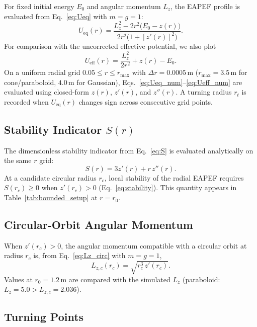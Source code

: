 \documentclass[11pt,letterpaper]{article}
\begin{document}
For fixed initial energy $E_0$ and angular momentum $L_z$, the EAPEF profile is evaluated from Eq.~\eqref{eq:Ueq} with $m=g=1$:
\begin{equation}\label{eq:Ueq_num}
    U_{\mathrm{eq}}(r)
    = \frac{L_z^2 - 2r^2\bigl(E_0 - z(r)\bigr)}
           {2r^2\bigl(1 + [z'(r)]^2\bigr)}.
\end{equation}
For comparison with the uncorrected effective potential, we also plot
\begin{equation}\label{eq:Ueff_num}
    U_{\mathrm{eff}}(r) = \frac{L_z^2}{2r^2} + z(r) - E_0.
\end{equation}
On a uniform radial grid $0.05\le r\le r_{\max}$ with $\Delta r=0.0005\,\mathrm{m}$ ($r_{\max}=3.5\,\mathrm{m}$ for cone/paraboloid, $4.0\,\mathrm{m}$ for Gaussian), Eqs.~\eqref{eq:Ueq_num}--\eqref{eq:Ueff_num} are evaluated using closed-form $z(r)$, $z'(r)$, and $z''(r)$. A turning radius $r_t$ is recorded when $U_{\mathrm{eq}}(r)$ changes sign across consecutive grid points.

\subsection{Stability Indicator $S(r)$}
\label{sec:analysis_S}

The dimensionless stability indicator from Eq.~\eqref{eq:S} is evaluated analytically on the same $r$ grid:
\begin{equation}\label{eq:S_num}
    S(r) = 3z'(r) + r\,z''(r).
\end{equation}
At a candidate circular radius $r_c$, local stability of the radial EAPEF requires $S(r_c)\ge 0$ when $z'(r_c)>0$ (Eq.~\eqref{eq:stability}). This quantity appears in Table~\ref{tab:bounded_setup} at $r=r_0$.

\subsection{Circular-Orbit Angular Momentum}
\label{sec:analysis_Lzc}

When $z'(r_c)>0$, the angular momentum compatible with a circular orbit at radius $r_c$ is, from Eq.~\eqref{eq:Lz_circ} with $m=g=1$,
\begin{equation}\label{eq:Lzc_num}
    L_{z,c}(r_c) = \sqrt{r_c^3\,z'(r_c)}.
\end{equation}
Values at $r_0=1.2\,\mathrm{m}$ are compared with the simulated $L_z$ (paraboloid: $L_z=5.0>L_{z,c}=2.036$).

\subsection{Turning Points}
\label{sec:analysis_turning}
\end{document}
